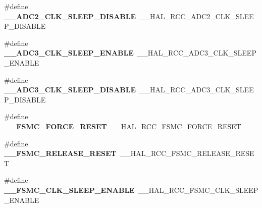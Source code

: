 \begin{DoxyCompactItemize}
\item 
\#define {\bfseries \+\_\+\+\_\+\+A\+D\+C2\+\_\+\+C\+L\+K\+\_\+\+S\+L\+E\+E\+P\+\_\+\+D\+I\+S\+A\+B\+LE}~\+\_\+\+\_\+\+H\+A\+L\+\_\+\+R\+C\+C\+\_\+\+A\+D\+C2\+\_\+\+C\+L\+K\+\_\+\+S\+L\+E\+E\+P\+\_\+\+D\+I\+S\+A\+B\+LE\hypertarget{group___h_a_l___r_c_c___aliased_gaccf07903e462de87910e343822775936}{}\label{group___h_a_l___r_c_c___aliased_gaccf07903e462de87910e343822775936}

\item 
\#define {\bfseries \+\_\+\+\_\+\+A\+D\+C3\+\_\+\+C\+L\+K\+\_\+\+S\+L\+E\+E\+P\+\_\+\+E\+N\+A\+B\+LE}~\+\_\+\+\_\+\+H\+A\+L\+\_\+\+R\+C\+C\+\_\+\+A\+D\+C3\+\_\+\+C\+L\+K\+\_\+\+S\+L\+E\+E\+P\+\_\+\+E\+N\+A\+B\+LE\hypertarget{group___h_a_l___r_c_c___aliased_ga70dc337170018b5b412db6b7c0859737}{}\label{group___h_a_l___r_c_c___aliased_ga70dc337170018b5b412db6b7c0859737}

\item 
\#define {\bfseries \+\_\+\+\_\+\+A\+D\+C3\+\_\+\+C\+L\+K\+\_\+\+S\+L\+E\+E\+P\+\_\+\+D\+I\+S\+A\+B\+LE}~\+\_\+\+\_\+\+H\+A\+L\+\_\+\+R\+C\+C\+\_\+\+A\+D\+C3\+\_\+\+C\+L\+K\+\_\+\+S\+L\+E\+E\+P\+\_\+\+D\+I\+S\+A\+B\+LE\hypertarget{group___h_a_l___r_c_c___aliased_gaa9fc68ed09451ca236c66d73424084b3}{}\label{group___h_a_l___r_c_c___aliased_gaa9fc68ed09451ca236c66d73424084b3}

\item 
\#define {\bfseries \+\_\+\+\_\+\+F\+S\+M\+C\+\_\+\+F\+O\+R\+C\+E\+\_\+\+R\+E\+S\+ET}~\+\_\+\+\_\+\+H\+A\+L\+\_\+\+R\+C\+C\+\_\+\+F\+S\+M\+C\+\_\+\+F\+O\+R\+C\+E\+\_\+\+R\+E\+S\+ET\hypertarget{group___h_a_l___r_c_c___aliased_gad461d9ba55841153c9feb590b52be1f0}{}\label{group___h_a_l___r_c_c___aliased_gad461d9ba55841153c9feb590b52be1f0}

\item 
\#define {\bfseries \+\_\+\+\_\+\+F\+S\+M\+C\+\_\+\+R\+E\+L\+E\+A\+S\+E\+\_\+\+R\+E\+S\+ET}~\+\_\+\+\_\+\+H\+A\+L\+\_\+\+R\+C\+C\+\_\+\+F\+S\+M\+C\+\_\+\+R\+E\+L\+E\+A\+S\+E\+\_\+\+R\+E\+S\+ET\hypertarget{group___h_a_l___r_c_c___aliased_gab73fd7208de5015546b98b38c5789c6a}{}\label{group___h_a_l___r_c_c___aliased_gab73fd7208de5015546b98b38c5789c6a}

\item 
\#define {\bfseries \+\_\+\+\_\+\+F\+S\+M\+C\+\_\+\+C\+L\+K\+\_\+\+S\+L\+E\+E\+P\+\_\+\+E\+N\+A\+B\+LE}~\+\_\+\+\_\+\+H\+A\+L\+\_\+\+R\+C\+C\+\_\+\+F\+S\+M\+C\+\_\+\+C\+L\+K\+\_\+\+S\+L\+E\+E\+P\+\_\+\+E\+N\+A\+B\+LE\hypertarget{group___h_a_l___r_c_c___aliased_ga404b58c024eb78288250055809bdfec4}{}\label{group___h_a_l___r_c_c___aliased_ga404b58c024eb78288250055809bdfec4}


\end{DoxyCompactItemize}
